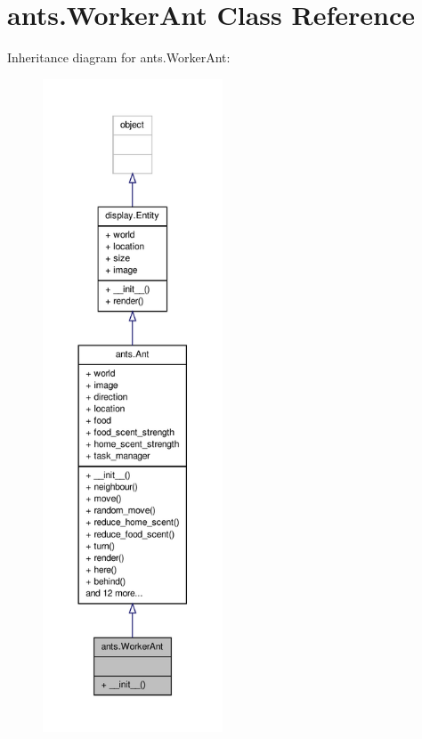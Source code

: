 \hypertarget{classants_1_1WorkerAnt}{\section{ants.\+Worker\+Ant Class Reference}
\label{classants_1_1WorkerAnt}
}


Inheritance diagram for ants.\+Worker\+Ant\+:
\nopagebreak
\begin{figure}[H]
\begin{center}
\leavevmode
\includegraphics[height=550pt]{classants_1_1WorkerAnt__inherit__graph}
\end{center}
\end{figure}


